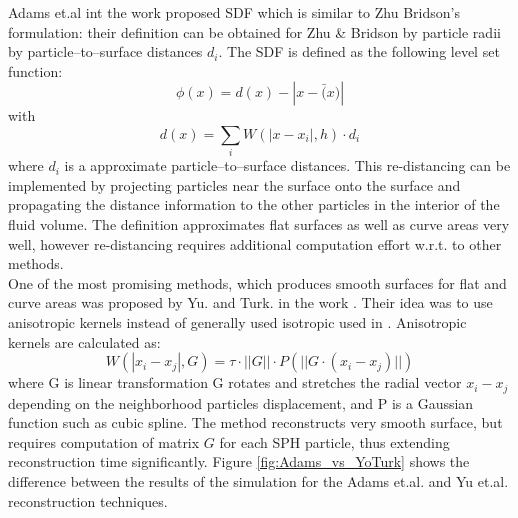 Adams et.al int the work \cite{AdamsEtAl} proposed SDF which is similar to Zhu Bridson's formulation: their definition can be obtained for Zhu \& Bridson by particle radii by particle–to–surface distances $d_i$. The SDF is defined as the following level set function:
\begin{equation}
	\phi(x) = d(x) - |x - \bar(x)|
\end{equation}
with
\begin{equation}
	d(x) = \sum_i W(|x - x_i|,h)\cdot d_i
\end{equation}
where $d_i$ is a approximate particle–to–surface distances. This re-distancing can be implemented by projecting particles near the surface onto the surface and propagating the distance information to the other particles in the interior of the fluid volume. The definition approximates flat surfaces as well as curve areas very well, however re-distancing requires additional computation effort w.r.t. to other methods.\\
One of the most promising methods, which produces smooth surfaces for flat and curve areas was proposed by Yu. and Turk. in the work \cite{YuTurk}. Their idea was to use anisotropic kernels instead of generally used isotropic used in \cite{Muller}. Anisotropic kernels are calculated as:
\begin{equation}
	W(|x_i - x_j|, G) = \tau \cdot  ||G|| \cdot P(||G \cdot (x_i - x_j)||)
\end{equation}
where G is linear transformation G rotates and stretches the radial vector $x_i - x_j$ depending on the neighborhood particles displacement, and P is a Gaussian function such as cubic spline. The method reconstructs very smooth surface, but requires computation of matrix $G$ for each SPH particle, thus extending reconstruction time significantly. Figure \ref{fig:Adams_vs_YoTurk} shows the difference between the results of the simulation for the Adams et.al. and Yu et.al. reconstruction techniques.
